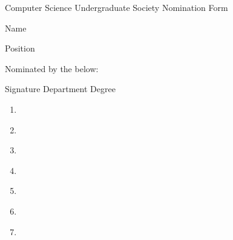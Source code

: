 \documentclass[fontsize=11]{scrartcl}
\begin{document}
\begin{center}
	\huge Computer Science Undergraduate Society Nomination Form
\end{center}

\begin{Form}

	Name \vspace{.5em} \\  \TextField[width=5in]{}
   
   \vspace{1.5em}
   
   Position \vspace{.5em} \\ \TextField[width=5in]{}
   
   \vspace{5em}
   
   \begin{center}
	   Nominated by the below:
	   
	   
		   	Signature \hspace{.8in} Department \hspace{.3in} Degree
    \begin{enumerate}
    	    \item \makebox[2in]{\hrulefill}  \makebox[1in]{\hrulefill}  \makebox[1in]{\hrulefill}  \\ 
    	    
    	    \item \makebox[2in]{\hrulefill}  \makebox[1in]{\hrulefill}  \makebox[1in]{\hrulefill}  \\ 
    	    
    	    \item \makebox[2in]{\hrulefill}  \makebox[1in]{\hrulefill}  \makebox[1in]{\hrulefill}  \\ 
    	    
    	    \item \makebox[2in]{\hrulefill}  \makebox[1in]{\hrulefill}  \makebox[1in]{\hrulefill}  \\ 
    	    
    	    \item \makebox[2in]{\hrulefill}  \makebox[1in]{\hrulefill}  \makebox[1in]{\hrulefill}  \\ 
    	    
    	    \item \makebox[2in]{\hrulefill}  \makebox[1in]{\hrulefill}  \makebox[1in]{\hrulefill}  \\ 
    	    
    	    \item \makebox[2in]{\hrulefill}  \makebox[1in]{\hrulefill}  \makebox[1in]{\hrulefill}  \\ 
    	    

\end{enumerate}
\end{center}
\end{Form}
\end{document}
